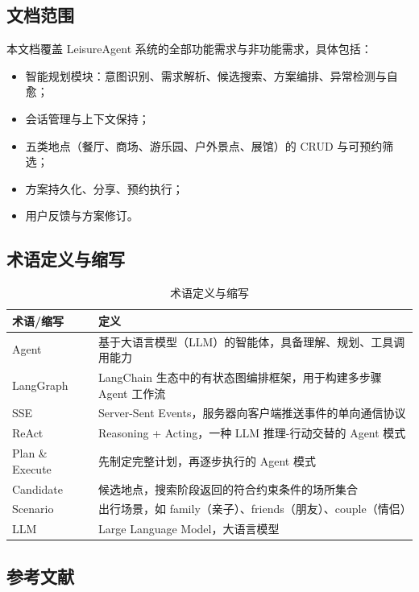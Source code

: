 \documentclass[12pt,a4paper]{ctexart}
\begin{document}
\subsection{文档范围}

本文档覆盖 LeisureAgent 系统的全部功能需求与非功能需求，具体包括：

\begin{itemize}
  \item 智能规划模块：意图识别、需求解析、候选搜索、方案编排、异常检测与自愈；
  \item 会话管理与上下文保持；
  \item 五类地点（餐厅、商场、游乐园、户外景点、展馆）的 CRUD 与可预约筛选；
  \item 方案持久化、分享、预约执行；
  \item 用户反馈与方案修订。
\end{itemize}

\subsection{术语定义与缩写}

\begin{table}[ht]
\centering
\begin{tabular}{p{3cm}p{10cm}}
\toprule
\textbf{术语/缩写} & \textbf{定义} \\
\midrule
Agent    & 基于大语言模型（LLM）的智能体，具备理解、规划、工具调用能力 \\
LangGraph & LangChain 生态中的有状态图编排框架，用于构建多步骤 Agent 工作流 \\
SSE      & Server-Sent Events，服务器向客户端推送事件的单向通信协议 \\
ReAct    & Reasoning + Acting，一种 LLM 推理-行动交替的 Agent 模式 \\
Plan \& Execute & 先制定完整计划，再逐步执行的 Agent 模式 \\
Candidate & 候选地点，搜索阶段返回的符合约束条件的场所集合 \\
Scenario & 出行场景，如 family（亲子）、friends（朋友）、couple（情侣） \\
LLM      & Large Language Model，大语言模型 \\
\bottomrule
\end{tabular}
\caption{术语定义与缩写}
\label{tab:glossary}
\end{table}

\subsection{参考文献}
\end{document}
